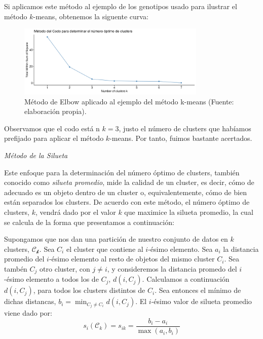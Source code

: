 \begin{ejemplo}
    Si aplicamos este método al ejemplo de los genotipos usado para ilustrar el método $k$-means, obtenemos la siguente curva:
    \begin{figure}[h]
        \centering
        \includegraphics[width=0.8\textwidth]{../img/elbow.png}
        \caption{Método de Elbow aplicado al ejemplo del método k-means (Fuente: elaboración propia).}
    \end{figure}

    Observamos que el codo está n $k=3$, justo el número de clusters que habíamos prefijado para aplicar el método $k$-means. Por tanto, fuimos bastante acertados.
    
\end{ejemplo}

\textit{Método de la Silueta} \newline  %

Este enfoque para la determinación del número óptimo de clusters, también conocido como \textit{silueta promedio}, mide la calidad de un cluster, es decir, cómo de adecuado es un objeto dentro de un cluster o,
equivalentemente, cómo de bien están separados los clusters. De acuerdo con este método, el número óptimo de clusters, $k$, vendrá dado por el valor $k$ que maximice la silueta promedio, la cual se calcula de
la forma que presentamos a continuación:

Supongamos que nos dan una partición de nuestro conjunto de datos en $k$ clusters, $\mathcal{C_{k}}$. Sea $C_{i}$ el cluster que contiene al $i$-ésimo elemento. Sea $a_{i}$ la distancia promedio del $i$-ésimo elemento al resto de 
objetos del mismo cluster $C_{i}$. Sea tambén $C_{j}$ otro cluster, con $j \neq i$, y consideremos la distancia promedo del $i$-ésimo elemento a todos los de $C_{j}$, $d(i,C_{j})$. Calculamos a continuación $d(i,C_{j})$,
para todos los clusters distintos de $C_{i}$. Sea entonces el mínimo de dichas distancas, $b_{i} = \min_{C_{j}\neq C_{i}}d(i,C_{j})$. El $i$-ésimo valor de silueta promedio viene dado por:
\[
s_{i}(\mathcal{C}_{k}) = s_{ik} = \frac{b_{i}-a_{i}}{\max (a_{i},b_{i})}
\]

